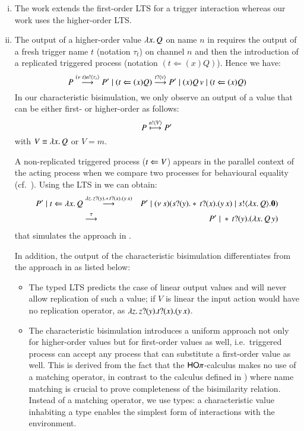 \begin{enumerate}[i)]
	\item	The work \cite{JeffreyR05} extends the first-order
		LTS for a trigger interaction whereas 
		our work uses the higher-order LTS. 

	\item	The output of a higher-order value $\lambda x.\,Q$ on name
		$n$ in \cite{JeffreyR05}
		requires the output of
		a fresh trigger name $t$ (notation $\tau_t$)
		on channel $n$ 
		and then the introduction of a replicated triggered process
		(notation $(t \Leftarrow (x) Q)$). 
		Hence we have:
		\[
			P \stackrel{(\nu\ t) n ! \langle \tau_{t} \rangle}{\longrightarrow} P' \;|\; (t \Leftarrow (x) Q) \stackrel{t ? \langle v \rangle}{\longrightarrow} P' \;|\; (x) Q\,v \;|\; (t \Leftarrow (x) Q) 
		\]
	In our characteristic bisimulation, we only observe
	an output of a value that can be either first- or higher-order as follows:
		\[
			P \stackrel{n ! \langle V \rangle}{\longmapsto} P' 
		\]
		with $V \equiv \lambda x.\,Q$ or $V = m$.

		A non-replicated triggered process ($t \Leftarrow V$)
		appears in 
		the parallel context of the acting process when
		we compare two processes for behavioural equality
		(cf.~).
		Using the LTS in
		 we can obtain:
		\begin{eqnarray*}
			P' \;|\; t \Leftarrow \lambda x.\,Q
			&\stackrel{\lambda z.\,z ? (y) . \ast\,{} t ? (x) . (y\,x)}{\longrightarrow}&
			P' \;|\; (\nu\ s)(s ? (y) . \ast\,{} t ? (x) . 
(y\,x) \;|\; s ! \langle \lambda x.\,Q \rangle . \mathbf{0})\\
			&\stackrel{\tau}{\longrightarrow}&
			P' \;|\; \ast\,{}t ? (y) . (\lambda x.\,Q\,y)
		\end{eqnarray*}
		that simulates the approach in \cite{JeffreyR05}.

	In addition, the output of the characteristic bisimulation 
differentiates from
		the approach in \cite{JeffreyR05} as listed below:
		\begin{itemize}
			\item	The typed LTS predicts the case of linear
				output values and will never allow replication
				of such a value;
				if $V$ is linear the input action would have no replication
				operator, as
				$\lambda z.\,z ? (y) . t ? (x) . (y\,x)$.

			\item	The characteristic bisimulation introduces a uniform approach
				not only for
				higher-order values but for first-order values
				as well, i.e.~triggered process can accept any
				process that can substitute a first-order value as well.
				This is derived from the fact that the $\mathsf{HO}\pi$-calculus makes no use of a matching operator, in contrast
				to the calculus defined in \cite{JeffreyR05})
				where name matching is crucial to prove completeness
				of the bisimilarity relation.
				Instead of a matching operator, 
we use types: a characteristic value inhabiting a type
enables the simplest form of interactions 
				with the environment.


\end{itemize}
\end{enumerate}
